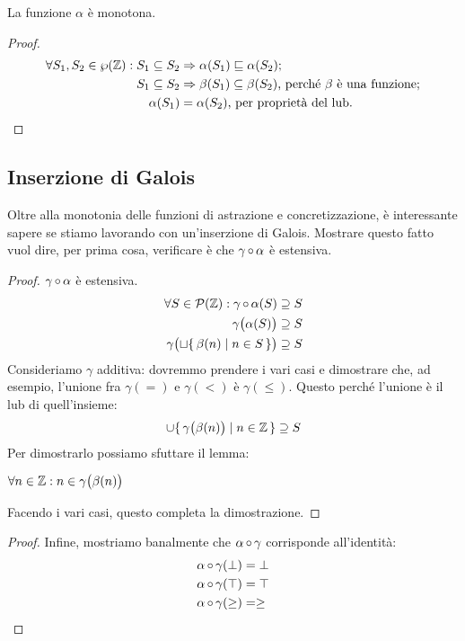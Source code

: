 \begin{proposizione}
La funzione $\alpha$ è monotona.
\end{proposizione}
\begin{proof}
	\begin{align*}
		\forall S_1, S_2 \in \wp(\mathbb{Z}) \mathrel{:} S_1 \subseteq S_2 &\Rightarrow \alpha(S_1) \sqsubseteq \alpha(S_2)\text{;} \\
		S_1 \subseteq S_2 &\Rightarrow \beta(S_1) \subseteq \beta(S_2) \text{, perché } \beta \text{ è  una funzione;} \\
		\alpha(S_1) &= \alpha(S_2) \text{, per proprietà del lub.}
	\end{align*}
\end{proof}

\subsection{Inserzione di Galois}

Oltre alla monotonia delle funzioni di astrazione e concretizzazione,
è interessante sapere se stiamo lavorando con un'inserzione di Galois.
Mostrare questo fatto vuol dire, per prima cosa,
verificare è che $\mathrm{\gamma}\mathop{\circ}\mathrm{\alpha}$ è estensiva. 

\begin{proof}
$\mathrm{\gamma}\mathop{\circ}\mathrm{\alpha}$ è estensiva.
\begin{align*}
	\forall S \in \mathcal{P}(\mathbb{Z}) \mathrel{:} \mathrm{\gamma}\mathop{\circ}\mathrm{\alpha}(S) &\supseteq S \\
	\gamma\bigl(\alpha(S)\bigr) &\supseteq S \\
	\gamma\bigl(\sqcup \{\, \beta(n) \mid n \in S \,\} \bigr) &\supseteq S
\end{align*}
Consideriamo $\gamma$ additiva: dovremmo prendere i vari casi e
dimostrare che, ad esempio, l'unione fra
$\gamma(=)$ e $\gamma(<)$ è $\gamma(\leq)$.
Questo perché l'unione è il lub di quell'insieme:
\[
	\cup \{\, \gamma\bigl(\beta(n)\bigr) \mid n \in \mathbb{Z} \,\} \supseteq S
\]
Per dimostrarlo possiamo sfuttare il lemma:
\begin{lemma}
	$ \forall n \in \mathbb{Z} \mathrel{:} n \in \gamma\bigl(\beta(n)\bigr) $
\end{lemma}
Facendo i vari casi, questo completa la dimostrazione.
\end{proof}

\begin{proof}
Infine, mostriamo banalmente che $\mathrm{\alpha}\mathop{\circ}\mathrm{\gamma}$ corrisponde all'identità:
\begin{align*}
	\mathrm{\alpha}\mathop{\circ}\mathrm{\gamma}(\bot) &= \bot \\
	\mathrm{\alpha}\mathop{\circ}\mathrm{\gamma}(\top) &= \top \\
	\mathrm{\alpha}\mathop{\circ}\mathrm{\gamma}(\geq) &= \geq
\end{align*}
\end{proof}

